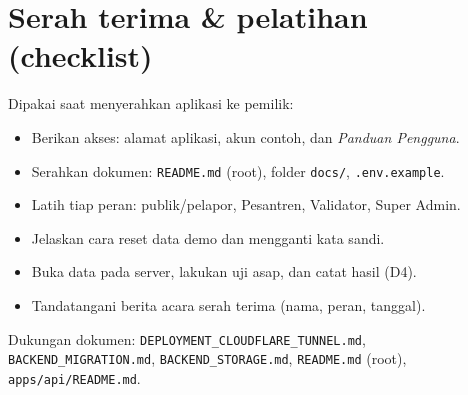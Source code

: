 \documentclass[11pt,a4paper]{article}
\newcommand{\code}[1]{\texttt{#1}}
\begin{document}
\section{Serah terima \& pelatihan (checklist)}

Dipakai saat menyerahkan aplikasi ke pemilik:
\begin{itemize}
  \item[$\square$] Berikan akses: alamat aplikasi, akun contoh, dan \emph{Panduan
        Pengguna}.
  \item[$\square$] Serahkan dokumen: \code{README.md} (root), folder \code{docs/},
        \code{.env.example}.
  \item[$\square$] Latih tiap peran: publik/pelapor, Pesantren, Validator, Super
        Admin.
  \item[$\square$] Jelaskan cara reset data demo dan mengganti kata sandi.
  \item[$\square$] Buka data pada server, lakukan uji asap, dan catat hasil (D4).
  \item[$\square$] Tandatangani berita acara serah terima (nama, peran, tanggal).
\end{itemize}

\vfill
\noindent Dukungan dokumen: \code{DEPLOYMENT\_CLOUDFLARE\_TUNNEL.md},
\code{BACKEND\_MIGRATION.md}, \code{BACKEND\_STORAGE.md}, \code{README.md} (root),
\code{apps/api/README.md}.
\end{document}
